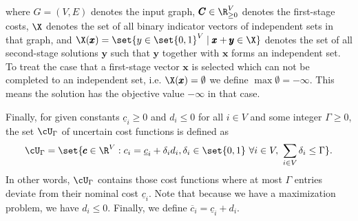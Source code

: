 \documentclass[a4paper,abstracton]{scrartcl}
\begin{document}
where $G = (V,E)$ denotes the input graph, $\pmb C \in \R_{\geq 0}^V$ denotes the first-stage costs, $\X$ denotes the set of all binary indicator vectors of independent sets in that graph, and $\X(\pmb x) = \set{y \in \set{0,1}^V \mid \pmb x + \pmb y \in \X}$ denotes the set of all second-stage solutions $\pmb y$ such that $\pmb y$ together with $\pmb x$ forms an independent set. To treat the case that a first-stage vector $\pmb x$ is selected which can not be completed to an independent set, i.e. $\X(\pmb x) = \emptyset$ we define $\max \emptyset = -\infty$. This means the solution has the objective value $-\infty$ in that case.

Finally, for given constants $\underline{c}_i \geq 0$ and $d_i \leq 0$ for all $i \in V$ and some integer $\Gamma \geq 0$, the set $\cU_\Gamma$ of uncertain cost functions is defined as
\[
\cU_\Gamma = \set{ \pmb c \in \R^V : c_i = \underline{c}_i + \delta_id_i, \delta_i \in \set{0,1}\ \forall i \in V,\ \sum_{i \in V}\delta_i \leq \Gamma }.
\]
In other words, $\cU_\Gamma$ contains those cost functions where at most $\Gamma$ entries deviate from their nominal cost $\underline{c}_i$. Note that because we have a maximization problem, we have $d_i \leq 0$. Finally, we define $\overline{c}_i = \underline{c}_i + d_i$.
\end{document}
